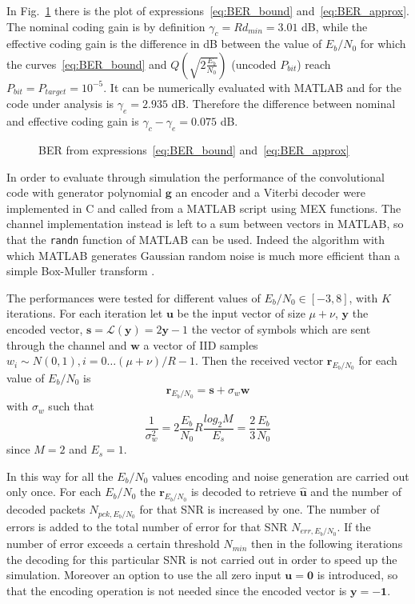 \documentclass[10pt]{article}
\newlength\fheight
\newlength\fwidth
\begin{document}
In Fig.~\ref{fig:BER_theory} there is the plot of expressions~\eqref{eq:BER_bound} and~\eqref{eq:BER_approx}. The nominal coding gain is by definition $\gamma_c = Rd_{min} = 3.01$ dB, while the effective coding gain is the difference in dB between the value of $E_b/N_0$ for which the curves~\eqref{eq:BER_bound} and $Q\left(\sqrt{2\frac{E_b}{N_0}}\right)$ (uncoded $P_{bit}$) reach $P_{bit} = P_{target} = 10^{-5}$. It can be numerically evaluated with MATLAB and for the code under analysis is $\gamma_e = 2.935$ dB. Therefore the difference between nominal and effective coding gain is $\gamma_c - \gamma_e = 0.075$ dB.
\begin{figure}[t]
\centering
\setlength{}
\setlength{}

\caption{BER from expressions~\eqref{eq:BER_bound} and~\eqref{eq:BER_approx}}
\label{fig:BER_theory}
\end{figure}

In order to evaluate through simulation the performance of the convolutional code with generator polynomial $\mathbf{g}$ an encoder and a Viterbi decoder were implemented in C and called from a MATLAB script using MEX functions. 
The channel implementation instead is left to a sum between vectors in MATLAB, so that the \texttt{randn} function of MATLAB can be used. Indeed the algorithm with which MATLAB generates Gaussian random noise is much more efficient than a simple Box-Muller transform \cite{moler}.

The performances were tested for different values of $E_b/N_0 \in [-3, 8]$, with $K$ iterations. For each iteration let $\mathbf{u}$ be the input vector of size $\mu + \nu$, $\mathbf{y}$ the encoded vector, $\mathbf{s} = \mathcal{L}(\mathbf{y}) = 2\mathbf{y} - 1$ the vector of symbols which are sent through the channel and $\mathbf{w}$ a vector of IID samples $w_i \sim N(0,1), i = 0 \dots (\mu + \nu)/R - 1$. Then the received vector $\mathbf{r}_{E_b/N_0}$ for each value of $E_b/N_0$ is 
\begin{equation}
	\mathbf{r}_{E_b/N_0} = \mathbf{s} + \sigma_w \mathbf{w}
\end{equation}
with $\sigma_w$ such that
\begin{equation}
	\frac{1}{\sigma_w^2} = 2\frac{E_b}{N_0}R\frac{log_2M}{E_s} = \frac{2}{3} \frac{E_b}{N_0}
\end{equation}
since $M=2$ and $E_s = 1$.

In this way for all the $E_b/N_0$ values encoding and noise generation are carried out only once. For each $E_b/N_0$ the $\mathbf{r}_{E_b/N_0}$ is decoded to retrieve $\mathbf{\hat{u}}$ and the number of decoded packets $N_{pck, E_b/N_0}$ for that SNR is increased by one. The number of errors is added to the total number of error for that SNR $N_{err, E_b/N_0}$. If the number of error exceeds a certain threshold $N_{min}$ then in the following iterations the decoding for this particular SNR is not carried out in order to speed up the simulation. Moreover an option to use the all zero input $\mathbf{u} = \mathbf{0}$ is introduced, so that the encoding operation is not needed since the encoded vector is $\mathbf{y} = -\mathbf{1}$.
\end{document}
